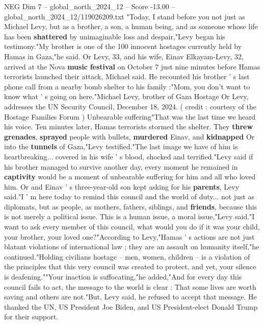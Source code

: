\begin{textsample}{NEG Dim 7 – global\_north\_2024\_12 – Score -13.00 – global\_north\_2024\_12/119026209.txt}  \label{ex:f7_neg_151}
"Today, I stand before you not just as Michael Levy, but as a brother, a son, a human being, and as someone whose life has been \textbf{shattered} by unimaginable loss and despair,"Levy began his testimony."My brother is one of the 100 innocent hostages currently held by Hamas in Gaza,"he said.
Or Levy, 33, and his wife, Einav Elkayam-Levy, 32, arrived at the Nova \textbf{music} \textbf{festival} on October 7 just nine minutes before Hamas terrorists launched their attack, Michael said.
He recounted his brother ' s last phone call from a nearby bomb shelter to his family :"Mom, you don't want to know what ' s going on here."Michael Levy, brother of Gaza Hostage Or Levy, addresses the UN Security Council, December 18, 2024. ( credit : courtesy of the Hostage Families Forum ) Unbearable suffering"That was the last time we heard his voice.
Ten minutes later, Hamas terrorists stormed the shelter.
They \textbf{threw} \textbf{grenades}, \textbf{sprayed} people with bullets, \textbf{murdered} Einav, and \textbf{kidnapped} Or into the \textbf{tunnels} of Gaza,"Levy testified."The last image we have of him is heartbreaking... covered in his wife ' s blood, shocked and terrified."Levy said if his brother managed to survive another day, every moment he remained in \textbf{captivity} would be a moment of unbearable suffering for him and all who loved him.
Or and Einav ' s three-year-old son kept asking for his \textbf{parents}, Levy said."I ' m here today to remind this council and the world of duty... not just as diplomats, but as people, as mothers, fathers, siblings, and \textbf{friends}, because this is not merely a political issue.
This is a human issue, a moral issue,"Levy said."I want to ask every member of this council, what would you do if it was your child, your brother, your loved one?"According to Levy,"Hamas ' s actions are not just blatant violations of international law ; they are an assault on humanity itself,"he continued."Holding civilians hostage -- men, women, children -- is a violation of the principles that this very council was created to protect, and yet, your silence is deafening.""Your inaction is suffocating,"he added,"And for every day this council fails to act, the message to the world is clear : That some lives are worth saving and others are not."But, Levy said, he refused to accept that message.
He thanked the UN, US President Joe Biden, and US President-elect Donald Trump for their support.

\end{textsample}
